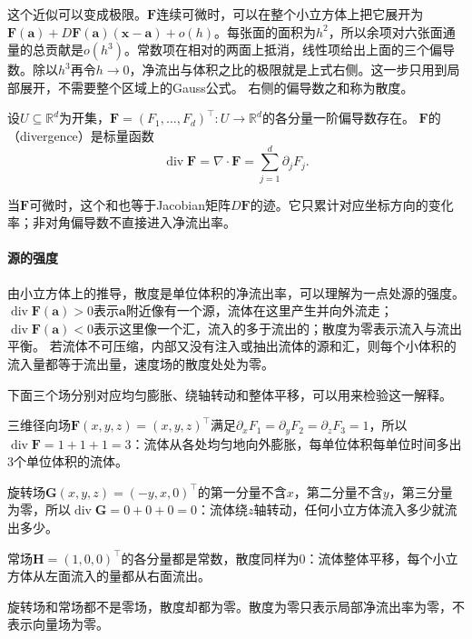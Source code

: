 这个近似可以变成极限。$\bm F$连续可微时，可以在整个小立方体上把它展开为$\bm F(\bm a)+D\bm F(\bm a)(\bm x-\bm a)+o(h)$。每张面的面积为$h^2$，所以余项对六张面通量的总贡献是$o(h^3)$。常数项在相对的两面上抵消，线性项给出上面的三个偏导数。除以$h^3$再令$h\to0$，净流出与体积之比的极限就是上式右侧。这一步只用到局部展开，不需要整个区域上的Gauss公式。
右侧的偏导数之和称为散度。
\begin{definition}[散度]
\label{def:multivariable-divergence}
设$U\subseteq\mathbb R^d$为开集，$\bm F=(F_1,\ldots,F_d)^\top:U\to\mathbb R^d$的各分量一阶偏导数存在。
$\bm F$的（divergence）是标量函数
\begin{equation}
 \operatorname{div}\bm F
 =\nabla\mathbin{\cdot}\bm F
 =\sum_{j=1}^d\partial_jF_j.
 \label{eq:multivariable-divergence}
\end{equation}
\end{definition}
当$\bm F$可微时，这个和也等于Jacobian矩阵$D\bm F$的迹。它只累计对应坐标方向的变化率；非对角偏导数不直接进入净流出率。

\paragraph{源的强度}

由小立方体上的推导，散度是单位体积的净流出率，可以理解为一点处源的强度。
$\operatorname{div}\bm F(\bm a)>0$表示$\bm a$附近像有一个源，流体在这里产生并向外流走；$\operatorname{div}\bm F(\bm a)<0$表示这里像一个汇，流入的多于流出的；散度为零表示流入与流出平衡。
若流体不可压缩，内部又没有注入或抽出流体的源和汇，则每个小体积的流入量都等于流出量，速度场的散度处处为零。

下面三个场分别对应均匀膨胀、绕轴转动和整体平移，可以用来检验这一解释。
\begin{example}
三维径向场$\bm F(x,y,z)=(x,y,z)^\top$满足$\partial_xF_1=\partial_yF_2=\partial_zF_3=1$，所以$\operatorname{div}\bm F=1+1+1=3$：流体从各处均匀地向外膨胀，每单位体积每单位时间多出$3$个单位体积的流体。

旋转场$\bm G(x,y,z)=(-y,x,0)^\top$的第一分量不含$x$，第二分量不含$y$，第三分量为零，所以$\operatorname{div}\bm G=0+0+0=0$：流体绕$z$轴转动，任何小立方体流入多少就流出多少。

常场$\bm H=(1,0,0)^\top$的各分量都是常数，散度同样为$0$：流体整体平移，每个小立方体从左面流入的量都从右面流出。
\end{example}
旋转场和常场都不是零场，散度却都为零。散度为零只表示局部净流出率为零，不表示向量场为零。

